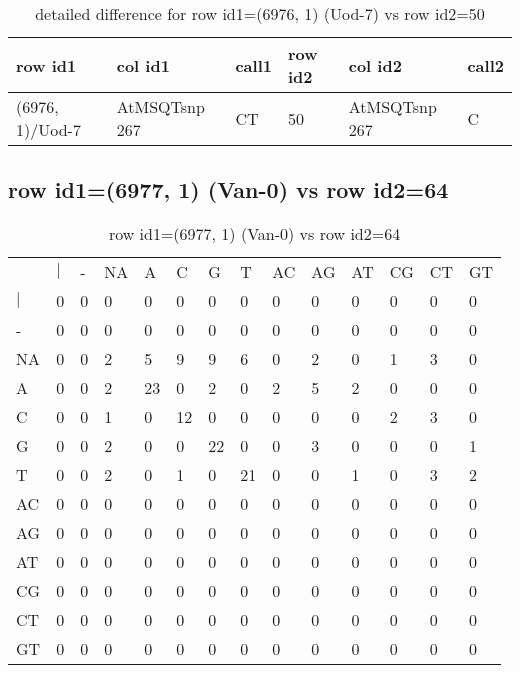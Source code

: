 \begin{center}
\begin{longtable}{|l|l|l|l|l|l|}
\caption{detailed difference for row id1=(6976, 1) (Uod-7) vs row id2=50} \label{table_dm195}\\
\hline
row id1&col id1&call1&row id2&col id2&call2\\
\hline
(6976, 1)/Uod-7&AtMSQTsnp 267&CT&50&AtMSQTsnp 267&C\\
\hline
\end{longtable}
\end{center}

\subsection{row id1=(6977, 1) (Van-0) vs row id2=64}
\begin{center}
\begin{longtable}{|l|l|l|l|l|l|l|l|l|l|l|l|l|l|}
\caption{row id1=(6977, 1) (Van-0) vs row id2=64} \label{table_dm196}\\
\hline
\\
\hline
&$|$&-&NA&A&C&G&T&AC&AG&AT&CG&CT&GT\\
$|$&0&0&0&0&0&0&0&0&0&0&0&0&0\\
-&0&0&0&0&0&0&0&0&0&0&0&0&0\\
NA&0&0&2&5&9&9&6&0&2&0&1&3&0\\
A&0&0&2&23&0&2&0&2&5&2&0&0&0\\
C&0&0&1&0&12&0&0&0&0&0&2&3&0\\
G&0&0&2&0&0&22&0&0&3&0&0&0&1\\
T&0&0&2&0&1&0&21&0&0&1&0&3&2\\
AC&0&0&0&0&0&0&0&0&0&0&0&0&0\\
AG&0&0&0&0&0&0&0&0&0&0&0&0&0\\
AT&0&0&0&0&0&0&0&0&0&0&0&0&0\\
CG&0&0&0&0&0&0&0&0&0&0&0&0&0\\
CT&0&0&0&0&0&0&0&0&0&0&0&0&0\\
GT&0&0&0&0&0&0&0&0&0&0&0&0&0\\
\hline
\end{longtable}
\end{center}

